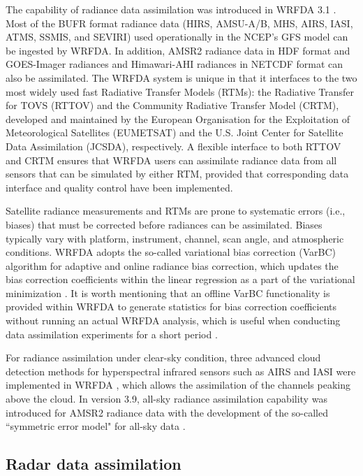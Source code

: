 The capability of radiance data assimilation was introduced in WRFDA 3.1 \citep{liu06}.
Most of the BUFR format radiance data (HIRS, AMSU-A/B, MHS, AIRS, IASI, ATMS, SSMIS, and SEVIRI) 
used operationally in the NCEP's GFS model can be ingested by WRFDA. In addition, AMSR2 radiance data
in HDF format \citep{yang16} and GOES-Imager radiances  \citep{yang17} and Himawari-AHI radiances \citep{wang18, xu21}
in NETCDF format can also be assimilated.
The WRFDA system is unique in that it interfaces to the two most widely used fast Radiative Transfer Models (RTMs): 
the Radiative Transfer for TOVS (RTTOV) and the Community Radiative Transfer Model (CRTM),
 developed and maintained by the European Organisation for the Exploitation of Meteorological Satellites (EUMETSAT) and
the U.S. Joint Center for Satellite Data Assimilation (JCSDA), respectively. A flexible interface to both RTTOV and CRTM
ensures that WRFDA users can assimilate radiance data from all sensors that can be simulated by either
RTM, provided that corresponding data interface and quality control have been implemented.

Satellite radiance measurements and RTMs are prone to systematic errors (i.e., biases) that must be
corrected before radiances can be assimilated. Biases typically vary with platform, instrument, channel,
scan angle, and atmospheric conditions. WRFDA adopts the so-called variational bias correction (VarBC) 
algorithm for adaptive and online radiance bias correction, which updates the bias correction coefficients
within the linear regression as a part of the variational minimization \citep{dee04,auligne07}.
It is worth mentioning that an offline VarBC functionality is provided within WRFDA to generate statistics for bias correction
coefficients without running an actual WRFDA analysis, which is useful when conducting data assimilation
experiments for a short period \citep{liu12}.

For radiance assimilation under clear-sky condition, three advanced cloud detection methods for hyperspectral infrared sensors 
such as AIRS and IASI were implemented in WRFDA \citep{xu13, xu14, xu15, xu16, auligne14a, auligne14b}, 
which allows the assimilation of the channels peaking above the cloud.
In version 3.9, all-sky radiance assimilation capability was introduced for AMSR2 radiance data \citep{yang16} 
with the development of the so-called ``symmetric error model" for all-sky data \citep{geer11}.

\subsection{Radar data assimilation}

